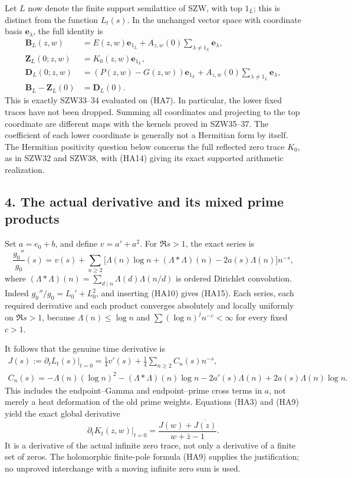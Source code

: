 \documentclass[
  10pt,
  a4paper,
]{article}
\begin{document}
Let \(L\) now denote the finite support semilattice of SZW, with top
\(1_L\); this is distinct from the function \(L_t(s)\). In the unchanged
vector space with coordinate basis \(\mathbf e_\lambda\), the full
identity is \[
\begin{aligned}
\boldsymbol B_L(z,w)&=E(z,w)\mathbf e_{1_L}
+A_{z,w}(0)\sum_{\lambda\ne1_L}\mathbf e_\lambda,\\
\boldsymbol Z_L(0;z,w)&=K_0(z,w)\mathbf e_{1_L},\\
\boldsymbol D_L(0;z,w)&=(P(z,w)-G(z,w))\mathbf e_{1_L}
+A_{z,w}(0)\sum_{\lambda\ne1_L}\mathbf e_\lambda,\\
\boldsymbol B_L-\boldsymbol Z_L(0)&=\boldsymbol D_L(0).
\end{aligned}\tag{HA14}
\] This is exactly SZW33--34 evaluated on (HA7). In particular, the
lower fixed traces have not been dropped. Summing all coordinates and
projecting to the top coordinate are different maps with the kernels
proved in SZW35--37. The coefficient of each lower coordinate is
generally not a Hermitian form by itself. The Hermitian positivity
question below concerns the full reflected zero trace \(K_0\), as in
SZW32 and SZW38, with (HA14) giving its exact supported arithmetic
realization.

\subsection{4. The actual derivative and its mixed prime
products}\label{the-actual-derivative-and-its-mixed-prime-products}

Set \(a=e_0+b\), and define \(v=a'+a^2\). For \(\Re s>1\), the exact
series is \[
\frac{g_0''}{g_0}(s)
=v(s)+\sum_{n\ge2}\bigl[\Lambda(n)\log n+(\Lambda*\Lambda)(n)-2a(s)\Lambda(n)\bigr]n^{-s},
\tag{HA15}
\] where \((\Lambda*\Lambda)(n)=\sum_{d\mid n}\Lambda(d)\Lambda(n/d)\)
is ordered Dirichlet convolution. Indeed \(g_0''/g_0=L_0'+L_0^2\), and
inserting (HA10) gives (HA15). Each series, each required derivative and
each product converges absolutely and locally uniformly on \(\Re s>1\),
because \(\Lambda(n)\le\log n\) and \(\sum (\log n)^j n^{-c}<\infty\)
for every fixed \(c>1\).

It follows that the genuine time derivative is \[
\begin{aligned}
J(s):=\left.\partial_tL_t(s)\right|_{t=0}
=\frac14v'(s)+\frac14\sum_{n\ge2}C_n(s)n^{-s},\\
C_n(s)=-\Lambda(n)(\log n)^2-(\Lambda*\Lambda)(n)\log n
-2a'(s)\Lambda(n)+2a(s)\Lambda(n)\log n.
\end{aligned}\tag{HA16}
\] This includes the endpoint--Gamma and endpoint--prime cross terms in
\(a\), not merely a heat deformation of the old prime weights. Equations
(HA3) and (HA9) yield the exact global derivative \[
\boxed{\left.\partial_tK_t(z,w)\right|_{t=0}
=\frac{J(w)+\overline{J(z)}}{w+\bar z-1}.}
\tag{HA17}
\] It is a derivative of the actual infinite zero trace, not only a
derivative of a finite set of zeros. The holomorphic finite-pole formula
(HA9) supplies the justification; no unproved interchange with a moving
infinite zero sum is used.
\end{document}
